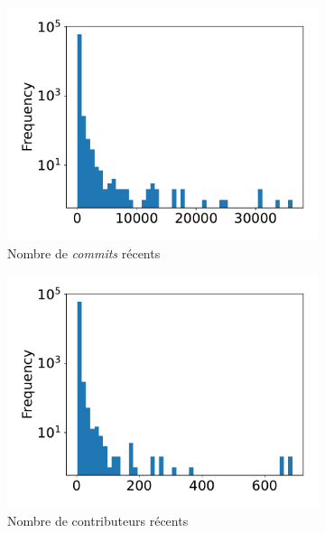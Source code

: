 \documentclass[dvipsnames,runningheads]{llncs}
\begin{document}
    \begin{figure}[ht]
        \begin{subfigure}[t]{0.3\textwidth}
            \includegraphics[width=\textwidth]{../experiment/data_analysis/recentCommitCount_distribution}
            \caption{Nombre de \emph{commits} récents}
        \end{subfigure}
        \begin{subfigure}[t]{0.3\textwidth}
            \includegraphics[width=\textwidth]{../experiment/data_analysis/recentContributorCount_distribution}
            \caption{Nombre de contributeurs récents}
        \end{subfigure}%
        \begin{subfigure}[t]{0.3\textwidth}

\end{subfigure}
\end{figure}
\end{document}
